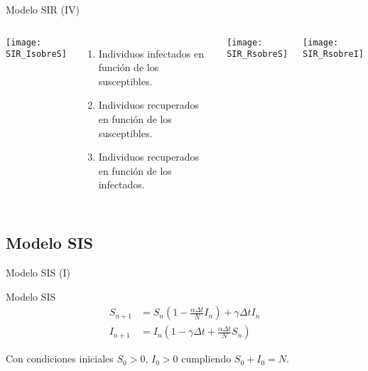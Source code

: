 \begin{frame}{Modelo SIR (IV)}

    \begin{columns}
        \begin{minipage}[c][0.4\textheight][c]{\linewidth}
          \centering
          \texttt{[image: SIR\_IsobreS]}
        \end{minipage}
        \begin{minipage}[c][0.4\textheight][c]{\linewidth}
            \begin{enumerate}
                \item Individuos infectados en función de los susceptibles.
                \item Individuos recuperados en función de los susceptibles.
                \item Individuos recuperados en función de los infectados.
            \end{enumerate}
          
        \end{minipage}
        \begin{minipage}[c][0.4\textheight][c]{\linewidth}
            \centering
            \texttt{[image: SIR\_RsobreS]}
        \end{minipage}
        \begin{minipage}[c][0.4\textheight][c]{\linewidth}
          \centering
          \texttt{[image: SIR\_RsobreI]}
        \end{minipage}
        \end{columns}

\end{frame}


\subsection{Modelo SIS}


\begin{frame}{Modelo SIS (I)}
    \begin{block}{Modelo SIS}
        \begin{equation}
            \label{eqn: modelo_SIS}
            \begin{aligned}
            S_{n+1} & = S_n \left(1-\frac{\alpha\Delta t}{N} I_n \right) + \gamma \Delta t I_n \\
            I_{n+1} & = I_n \left( 1-\gamma \Delta t + \frac{\alpha\Delta t}{N} S_n \right)
            \end{aligned}
            \end{equation}
            
            Con condiciones iniciales $S_0>0$, $I_0>0$ cumpliendo $S_0+I_0=N$.
    \end{block}
\end{frame}


